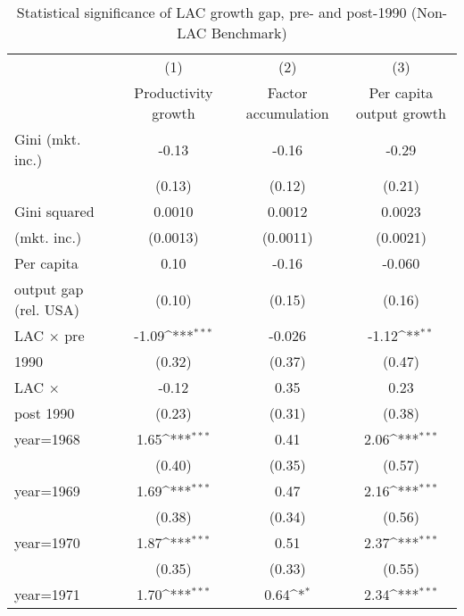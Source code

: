 \begin{sidewaystable}[htbp]\centering
\def\sym#1{\ifmmode^{#1}\else\(^{#1}\)\fi}
\caption{Statistical significance of LAC growth gap, pre- and post-1990 (Non-LAC Benchmark)}
\begin{tabular}{l*{3}{c}}
\toprule
                &\multicolumn{1}{c}{(1)}&\multicolumn{1}{c}{(2)}&\multicolumn{1}{c}{(3)}\\
                &\multicolumn{1}{c}{Productivity growth}&\multicolumn{1}{c}{Factor accumulation}&\multicolumn{1}{c}{Per capita output growth}\\
\midrule
Gini (mkt. inc.)&    -0.13         &    -0.16         &    -0.29         \\
                &   (0.13)         &   (0.12)         &   (0.21)         \\
\addlinespace
Gini squared    &   0.0010         &   0.0012         &   0.0023         \\
(mkt. inc.)     & (0.0013)         & (0.0011)         & (0.0021)         \\
\addlinespace
Per capita      &     0.10         &    -0.16         &   -0.060         \\
output gap (rel. USA)&   (0.10)         &   (0.15)         &   (0.16)         \\
\addlinespace
LAC $\times$ pre&    -1.09\sym{***}&   -0.026         &    -1.12\sym{**} \\
1990            &   (0.32)         &   (0.37)         &   (0.47)         \\
\addlinespace
LAC $\times$    &    -0.12         &     0.35         &     0.23         \\
post 1990       &   (0.23)         &   (0.31)         &   (0.38)         \\
\addlinespace
year=1968       &     1.65\sym{***}&     0.41         &     2.06\sym{***}\\
                &   (0.40)         &   (0.35)         &   (0.57)         \\
\addlinespace
year=1969       &     1.69\sym{***}&     0.47         &     2.16\sym{***}\\
                &   (0.38)         &   (0.34)         &   (0.56)         \\
\addlinespace
year=1970       &     1.87\sym{***}&     0.51         &     2.37\sym{***}\\
                &   (0.35)         &   (0.33)         &   (0.55)         \\
\addlinespace
year=1971       &     1.70\sym{***}&     0.64\sym{*}  &     2.34\sym{***}\\

\end{tabular}
\end{sidewaystable}
